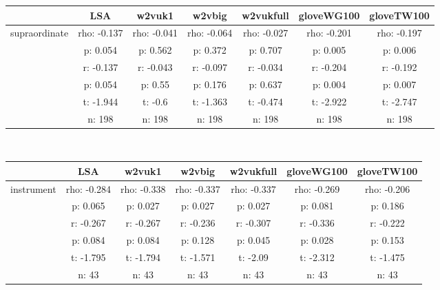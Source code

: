 \documentclass{article}
\begin{document}
\begin{tabular}{ccccccc|}\cline{2-7}
&\multicolumn{1}{|c}{LSA} & w2vuk1 & w2vbig & w2vukfull & gloveWG100 & gloveTW100 \\\hline
\multicolumn{1}{|c|}{\multirow{6}{*}{supraordinate}} & rho: -0.137 & rho: -0.041 & rho: -0.064 & rho: -0.027 & rho: -0.201 & rho: -0.197 \\
\multicolumn{1}{|c|}{} & p: 0.054 & p: 0.562 & p: 0.372 & p: 0.707 & p: 0.005 & p: 0.006 \\
\multicolumn{1}{|c|}{} & r: -0.137 & r: -0.043 & r: -0.097 & r: -0.034 & r: -0.204 & r: -0.192 \\
\multicolumn{1}{|c|}{} & p: 0.054 & p: 0.55 & p: 0.176 & p: 0.637 & p: 0.004 & p: 0.007 \\
\multicolumn{1}{|c|}{} & t: -1.944 & t: -0.6 & t: -1.363 & t: -0.474 & t: -2.922 & t: -2.747 \\
\multicolumn{1}{|c|}{} & n: 198 & n: 198 & n: 198 & n: 198 & n: 198 & n: 198 \\
\hline
\end{tabular}\\
\begin{tabular}{ccccccc|}\cline{2-7}
&\multicolumn{1}{|c}{LSA} & w2vuk1 & w2vbig & w2vukfull & gloveWG100 & gloveTW100 \\\hline
\multicolumn{1}{|c|}{\multirow{6}{*}{instrument}} & rho: -0.284 & rho: -0.338 & rho: -0.337 & rho: -0.337 & rho: -0.269 & rho: -0.206 \\
\multicolumn{1}{|c|}{} & p: 0.065 & p: 0.027 & p: 0.027 & p: 0.027 & p: 0.081 & p: 0.186 \\
\multicolumn{1}{|c|}{} & r: -0.267 & r: -0.267 & r: -0.236 & r: -0.307 & r: -0.336 & r: -0.222 \\
\multicolumn{1}{|c|}{} & p: 0.084 & p: 0.084 & p: 0.128 & p: 0.045 & p: 0.028 & p: 0.153 \\
\multicolumn{1}{|c|}{} & t: -1.795 & t: -1.794 & t: -1.571 & t: -2.09 & t: -2.312 & t: -1.475 \\
\multicolumn{1}{|c|}{} & n: 43 & n: 43 & n: 43 & n: 43 & n: 43 & n: 43 \\
\hline
\end{tabular}\\
\end{document}
